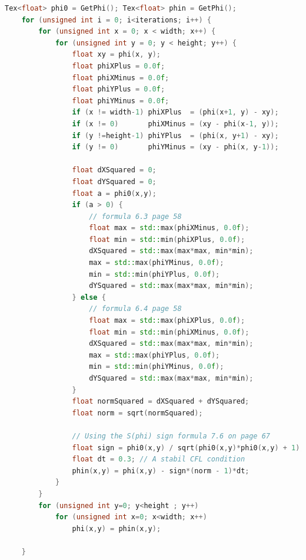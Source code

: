 \begin{lstlisting}[language=c++]
    Tex<float> phi0 = GetPhi(); Tex<float> phin = GetPhi();
    for (unsigned int i = 0; i<iterations; i++) {
        for (unsigned int x = 0; x < width; x++) {
            for (unsigned int y = 0; y < height; y++) {
                float xy = phi(x, y);                
                float phiXPlus = 0.0f;
                float phiXMinus = 0.0f;
                float phiYPlus = 0.0f;
                float phiYMinus = 0.0f;        	
                if (x != width-1) phiXPlus  = (phi(x+1, y) - xy);
                if (x != 0)       phiXMinus = (xy - phi(x-1, y));
                if (y !=height-1) phiYPlus  = (phi(x, y+1) - xy);
                if (y != 0)       phiYMinus = (xy - phi(x, y-1));
        	
                float dXSquared = 0;
                float dYSquared = 0;
                float a = phi0(x,y);
                if (a > 0) {
                    // formula 6.3 page 58
                    float max = std::max(phiXMinus, 0.0f);
                    float min = std::min(phiXPlus, 0.0f);
                    dXSquared = std::max(max*max, min*min);
                    max = std::max(phiYMinus, 0.0f);
                    min = std::min(phiYPlus, 0.0f);
                    dYSquared = std::max(max*max, min*min);
                } else {
                    // formula 6.4 page 58
                    float max = std::max(phiXPlus, 0.0f);
                    float min = std::min(phiXMinus, 0.0f);
                    dXSquared = std::max(max*max, min*min);
                    max = std::max(phiYPlus, 0.0f);
                    min = std::min(phiYMinus, 0.0f);
                    dYSquared = std::max(max*max, min*min);        				
                }
                float normSquared = dXSquared + dYSquared;           
                float norm = sqrt(normSquared);

                // Using the S(phi) sign formula 7.6 on page 67
                float sign = phi0(x,y) / sqrt(phi0(x,y)*phi0(x,y) + 1);
                float dt = 0.3; // A stabil CFL condition
                phin(x,y) = phi(x,y) - sign*(norm - 1)*dt;
            }
        }
        for (unsigned int y=0; y<height ; y++)
            for (unsigned int x=0; x<width; x++)
                phi(x,y) = phin(x,y);

    }
\end{lstlisting}
